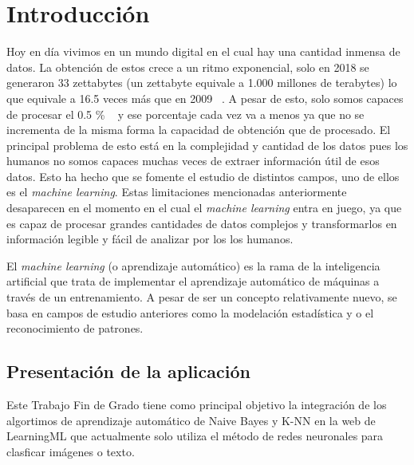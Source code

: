 \documentclass[a4paper, 12pt]{book}
\begin{document}

\cleardoublepage
\chapter{Introducción}
\label{sec:intro} %

Hoy en día vivimos en un mundo digital en el cual hay una cantidad inmensa de datos. La obtención de estos crece a un ritmo exponencial, solo en 2018 se generaron 33 zettabytes (un zettabyte equivale a 1.000 millones de terabytes) lo que equivale a 16.5 veces más que en 2009 ~\cite{webstatista}. A pesar de esto, solo somos capaces de procesar el 0.5 \% ~\cite{machinelearning} y ese porcentaje cada vez va a menos ya que no se incrementa de la misma forma la capacidad de obtención que de procesado. El principal problema de esto está en la complejidad y cantidad de los datos pues los humanos no somos capaces muchas veces de extraer información útil de esos datos. Esto ha hecho que se fomente el estudio de distintos campos, uno de ellos es el \emph{machine learning}. Estas limitaciones mencionadas anteriormente desaparecen en el momento en el cual el \emph{machine learning} entra en juego, ya que es capaz de procesar grandes cantidades de datos complejos y transformarlos en información legible y fácil de analizar por los los humanos.

El \emph{machine learning} (o aprendizaje automático) es la rama de la inteligencia artificial que trata de implementar el aprendizaje automático de máquinas a través de un entrenamiento. A pesar de ser un concepto relativamente nuevo, se basa en campos de estudio anteriores como la modelación estadística y o el reconocimiento de patrones.

\section{Presentación de la aplicación}
\label{sec:presentacionaplicacion}

Este Trabajo Fin de Grado tiene como principal objetivo la integración de los algortimos de aprendizaje automático de Naive Bayes y K-NN en la web de LearningML que actualmente solo utiliza el método de redes neuronales para clasficar imágenes o texto.
\end{document}
